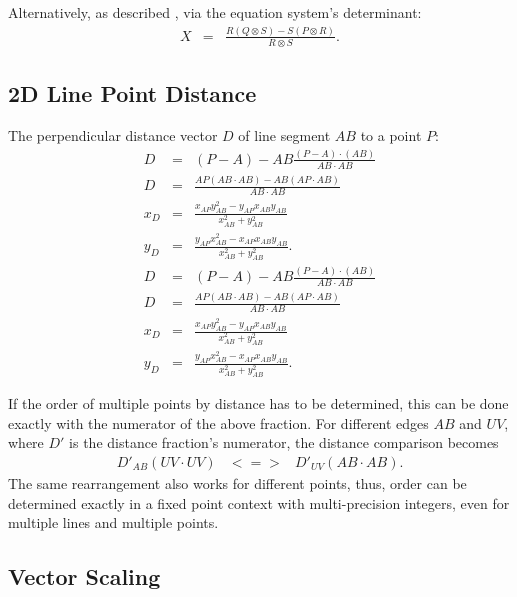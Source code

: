 \documentclass[12pt,a4paper,oneside,openany]{article}
\begin{document}
Alternatively, as described \cite{mw:lli}, via the equation system's determinant:
\begin{eqnarray*}
X &=& \frac{R (Q \otimes S )  - S (P \otimes R )}{R \otimes S}.
\end{eqnarray*}


\subsection{2D Line Point Distance}


The perpendicular distance vector $D$ of line segment $AB$ to a point $P$:
\begin{eqnarray*}
D &=& (P-A) - AB\frac{(P-A) \cdot (AB)}{AB \cdot AB}  \\
D &=& \frac{AP (AB \cdot AB) - AB (AP \cdot AB)}{AB \cdot AB} \\
x_D &=& \frac{x_{AP}y^2_{AB} - y_{AP}x_{AB}y_{AB}}{x_{AB}^2+y_{AB}^2} \\
y_D &=& \frac{y_{AP}x^2_{AB} - x_{AP}x_{AB}y_{AB}}{x_{AB}^2+y_{AB}^2} .
\end{eqnarray*}
\begin{eqnarray*}
D &=& (P-A) - AB\frac{(P-A) \cdot (AB)}{AB \cdot AB}  \\
D &=& \frac{AP (AB \cdot AB) - AB (AP \cdot AB)}{AB \cdot AB} \\
x_D &=& \frac{x_{AP}y^2_{AB} - y_{AP}x_{AB}y_{AB}}{x_{AB}^2+y_{AB}^2} \\
y_D &=& \frac{y_{AP}x^2_{AB} - x_{AP}x_{AB}y_{AB}}{x_{AB}^2+y_{AB}^2} .
\end{eqnarray*}

If the order of multiple points by distance has to be determined, this can be done exactly with the numerator of the above fraction. For different edges $AB$ and $UV$, where $D'$ is the distance fraction's numerator, the distance comparison becomes
\begin{eqnarray*}
D'_{AB} (UV \cdot UV) &<=>& D'_{UV} (AB \cdot AB) .
\end{eqnarray*}
The same rearrangement also works for different points, thus, order can  be determined exactly in a fixed point context with multi-precision integers, even for multiple lines and multiple points.


\subsection{Vector Scaling}
\end{document}
